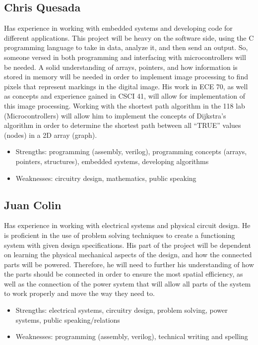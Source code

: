  \subsection{Chris Quesada}
Has experience in working with embedded systems and developing code for different applications. This project will be heavy on the software side, using the C programming language to take in data, analyze it, and then send an output. So, someone versed in both programming and interfacing with microcontrollers will be needed. A solid understanding  of arrays, pointers, and how information is stored in memory will be needed in order to implement image processing to find pixels that represent markings in the digital image. His work in ECE 70, as well as concepts and experience gained in CSCI 41, will allow for implementation of this image processing. Working with the shortest path algorithm in the 118 lab (Microcontrollers) will allow him to implement the concepts of Dijkstra's algorithm in order to determine the shortest path between all ``TRUE'' values (nodes) in a 2D array (graph).
\begin{itemize}
	\item Strengths: programming (assembly, verilog),  programming concepts (arrays, pointers, structures), embedded systems, developing algorithms
	
	\item Weaknesses:  circuitry design, mathematics, public speaking 
\end{itemize} \par
 \subsection{Juan Colin}
  Has experience in working with electrical systems and physical circuit design. He is proficient in the use of problem solving techniques to create a functioning system with given design specifications. His part of the project will be dependent on learning the physical mechanical aspects of the design, and how the connected parts will be powered. Therefore, he will need to further his understanding of how the parts should be connected in order to ensure the most spatial efficiency, as well as the connection of the power system that will allow all parts of the system to work properly and move the way they need to.
  
	\begin{itemize}
	\item Strengths: electrical systems, circuitry design, problem solving, power systems, public speaking/relations
	\item Weaknesses: programming (assembly, verilog), technical writing and spelling \\
\end{itemize}
 
